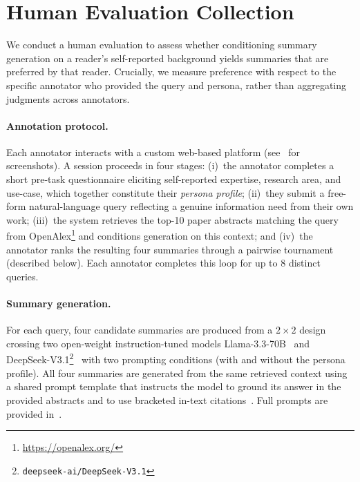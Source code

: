 \section{Human Evaluation Collection \hyperref[chsevenrq2]{\chsevenrqtwo}}\label{sec:ch-7-human-eval-setup}

We conduct a human evaluation to assess whether conditioning summary
generation on a reader's self-reported background yields summaries that
are preferred by that reader. Crucially, we measure preference with
respect to the specific annotator who provided the query and persona,
rather than aggregating judgments across annotators.

\paragraph{Annotation protocol.}
Each annotator interacts with a custom web-based platform
(see~ for screenshots). A session proceeds in four stages:
(i)~the annotator completes a short pre-task questionnaire eliciting
self-reported expertise, research area, and use-case, which together
constitute their \emph{persona profile};
(ii)~they submit a free-form natural-language query reflecting a
genuine information need from their own work;
(iii)~the system retrieves the top-10 paper abstracts matching the
query from OpenAlex\footnote{\url{https://openalex.org/}} and conditions generation on this
context; and
(iv)~the annotator ranks the resulting four summaries through a
pairwise tournament (described below). Each annotator completes this
loop for up to 8 distinct queries.

\paragraph{Summary generation.} For each query, four candidate summaries are produced from a
$2 \times 2$ design crossing two open-weight instruction-tuned models
Llama-3.3-70B~\cite{grattafiori2024llama3}
and DeepSeek-V3.1\footnote{\texttt{deepseek-ai/DeepSeek-V3.1}}~\cite{deepseekai2024deepseekv3technicalreport} with
two prompting conditions (with and without the persona profile). All
four summaries are generated from the same retrieved context using a
shared prompt template that instructs the model to ground its answer
in the provided abstracts and to use bracketed in-text
citations~\cite{lewis2020rag,gao2023ragsurvey}. Full prompts are
provided in~.

